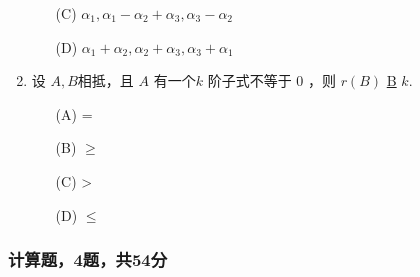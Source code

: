 \begin{enumerate}
\begin{enumerate}
        \item[(C)] $\alpha_1, \alpha_1-\alpha_2+\alpha_3, \alpha_3-\alpha_2$
        \item[(D)] $\alpha_1+\alpha_2, \alpha_2+\alpha_3, \alpha_3+\alpha_1$
    \end{enumerate}
    \item 设 $A,B$相抵，且 $A$ 有一个$k$ 阶子式不等于 0 ，则 $r(B)$ \underline{B} $k$.
    \begin{enumerate}
        \item[(A)] =
        \item[(B)] $\ge$
        \item[(C)] >
        \item[(D)] $\le$
    \end{enumerate}
\end{enumerate}

\subsubsection*{计算题，4题，共54分}

